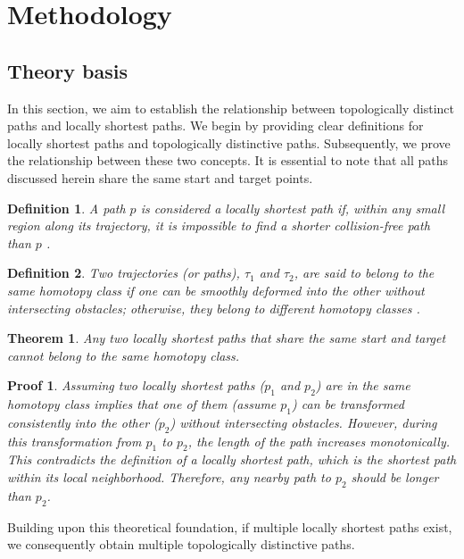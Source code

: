 \documentclass[lettersize,journal]{IEEEtran}
\newtheorem{myDef}{Definition}
\newtheorem{myTheo}{Theorem}
\newtheorem{myProof}{Proof}
\begin{document}
\section{Methodology}
\label{Methodology}

\subsection{Theory basis}

In this section, we aim to establish the relationship between topologically distinct paths and locally shortest paths. We begin by providing clear definitions for locally shortest paths and topologically distinctive paths. Subsequently, we prove the relationship between these two concepts. It is essential to note that all paths discussed herein share the same start and target points.
\begin{myDef}
A path $p$ is considered a locally shortest path if, within any small region along its trajectory, it is impossible to find a shorter collision-free path than $p$ \cite{131594}.
\end{myDef}

\begin{myDef}
Two trajectories (or paths), $\tau_1$ and $\tau_2$, are said to belong to the same homotopy class if one can be smoothly deformed into the other without intersecting obstacles; otherwise, they belong to different homotopy classes \cite{bhattacharya2010search}.
\end{myDef}

\begin{myTheo}
Any two locally shortest paths that share the same start and target cannot belong to the same homotopy class.
\end{myTheo}

\begin{myProof}
Assuming two locally shortest paths ($p_1$ and $p_2$) are in the same homotopy class implies that one of them (assume $p_1$) can be transformed consistently into the other ($p_2$) without intersecting obstacles. However, during this transformation from $p_1$ to $p_2$, the length of the path increases monotonically. This contradicts the definition of a locally shortest path, which is the shortest path within its local neighborhood. Therefore, any nearby path to $p_2$ should be longer than $p_2$.
\end{myProof}

Building upon this theoretical foundation, if multiple locally shortest paths exist, we consequently obtain multiple topologically distinctive paths.
\end{document}
